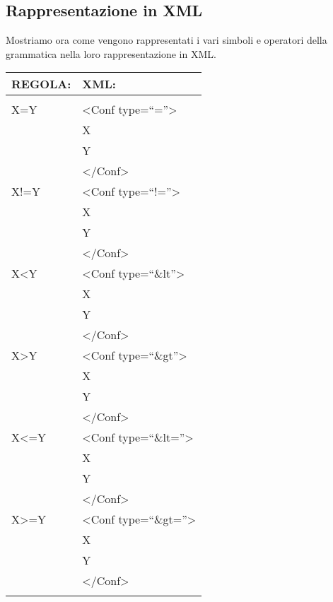 \begin{center}
\section{Rappresentazione in XML}
Mostriamo ora come vengono rappresentati i vari simboli e operatori della grammatica nella loro rappresentazione in XML.
\begin{table}[htbp]
\begin{tabular}{||p{3cm}||p{6.5cm}||}
\hline
\textbf{REGOLA:} & \textbf{XML:} \\ \hline
& \\ \hline
X=Y & \textless Conf type=``=''\textgreater \\
&   X \\
&   Y \\ 
& \textless /Conf\textgreater \\ \hline
X!=Y & \textless Conf type=``!=''\textgreater \\
&  X \\
&  Y \\ 
& \textless /Conf\textgreater\\ \hline
X\textless Y & \textless Conf type=``\&lt''\textgreater \\
&  X \\
&  Y \\ 
& \textless /Conf\textgreater\\ \hline
X\textgreater Y & \textless Conf type=``\&gt''\textgreater \\
&  X \\
&  Y \\ 
& \textless /Conf\textgreater\\ \hline
X\textless=Y & \textless Conf type=``\&lt=''\textgreater \\
&  X \\
&  Y \\ 
& \textless /Conf\textgreater\\ \hline
X\textgreater =Y &  \textless Conf type=``\&gt=''\textgreater \\
&  X \\
&  Y \\ 
& \textless /Conf\textgreater\\ \hline
& \\ \hline
\end{tabular} \\
\end{table}


\end{center}
